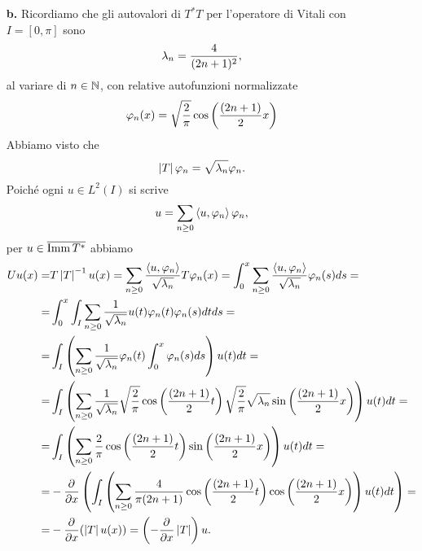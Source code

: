 \documentclass[a4paper]{article}
\begin{document}
\begin{solution}
\begin{enumerate}
\item [\textbf{b.}] Ricordiamo che gli autovalori di $T^\ast T$ per l'operatore di Vitali con $I=[0,\pi]$ sono
\[\lambda_n=\frac 4{(2n+1)^2},\]
al variare di $n\in \mathbb{N}$, con relative autofunzioni normalizzate
\[\varphi_n(x)=\sqrt{\frac{2}\pi}\cos\left({\frac{(2n+1)}2x}\right)\]
Abbiamo visto che
\[\left|{T}\right|\varphi_n=\sqrt{\lambda_n}\varphi_n.\]
Poich\'e ogni $u\in L^2(I)$ si scrive
\[u=\sum_{n\geq 0}\left\langle {u,\varphi_n}\right\rangle\varphi_n,\]
per $u\in \overline{\operatorname{Imm} T^\ast}$ abbiamo
\begin{align*}
Uu(x)=&T\abs T\ii u(x)=\sum_{n\geq 0}\frac{\ps{u,\vp_n}}{\sqrt{\la_n}}T\vp_n(x)=\int_0^x\sum_{n\geq 0}\frac{\ps{u,\vp_n}}{\sqrt{\la_n}}\vp_n(s)ds=\\
=&\int_0^x\int_I\sum_{n\geq 0}\frac1{\sqrt{\la_n}} u(t)\vp_n(t)\vp_n(s)dtds=\\
=&\int_I\pa{\sum_{n\geq 0}\frac1{\sqrt{\la_n}}\vp_n(t)\int_0^x\vp_n(s)ds}u(t)dt=\\
=&\int_I\pa{\sum_{n\geq 0}\frac1{\sqrt{\la_n}}\sqrt{\frac{2}\pi}\cos\pa{\frac{(2n+1)}2t}\sqrt{\frac{2}\pi}\sqrt{\la_n}\sin\pa{\frac{(2n+1)}2x}}u(t)dt=\\
=&\int_I\pa{\sum_{n\geq 0}\frac{2}\pi\cos\pa{\frac{(2n+1)}2t}\sin\pa{\frac{(2n+1)}2x}}u(t)dt=\\
=&-\pp x{}\pa{\int_I\pa{\sum_{n\geq 0}\frac{4}{\pi(2n+1)}\cos\pa{\frac{(2n+1)}2t}\cos\pa{\frac{(2n+1)}2x}}u(t)dt}=\\
=&-\pp x{}(\abs T u(x))=\pa{-\pp x{}\abs T}u.
\end{align*}


\end{enumerate}
\setlength{\leftmargini}{0.5cm}
\end{solution}
\end{document}
